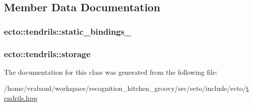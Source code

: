 \subsection{\-Member \-Data \-Documentation}
\hypertarget{classecto_1_1tendrils_a40635d009ae082dccde9486c1293212e}{
\subsubsection[{static\-\_\-bindings\-\_\-}]{ {\bf ecto\-::tendrils\-::static\-\_\-bindings\-\_\-}}}\label{classecto_1_1tendrils_a40635d009ae082dccde9486c1293212e}
\hypertarget{classecto_1_1tendrils_afaa587298937ffa94ccfefc8a97b4edc}{
\subsubsection[{storage}]{ {\bf ecto\-::tendrils\-::storage}}}\label{classecto_1_1tendrils_afaa587298937ffa94ccfefc8a97b4edc}


\-The documentation for this class was generated from the following file\-:\begin{DoxyCompactItemize}
\item 
/home/vrabaud/workspace/recognition\-\_\-kitchen\-\_\-groovy/src/ecto/include/ecto/\hyperlink{tendrils_8hpp}{tendrils.\-hpp}\end{DoxyCompactItemize}

